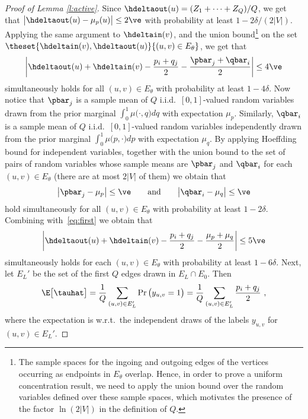\begin{proof}[Proof of Lemma \ref{l:active}]
Since $\hdeltaout(u) = (Z_1+\cdots+Z_Q)/Q$, we get that $\big|\hdeltaout(u) - \mu_p(u)\big| \le
2\ve$ with probability at least $1-2\delta/(2|V|)$. Applying the same argument to $\hdeltain(v)$,
and the union bound\footnote{The sample spaces for the ingoing and outgoing edges of the vertices
occurring as endpoints in $E_{\theta}$ overlap. Hence, in order to prove a uniform concentration
result, we need to apply the union bound over the random variables defined over these sample spaces,
which motivates the presence of the factor $\ln(2|V|)$ in the definition of $Q$.}
on the set $\theset{\hdeltain(v),\hdeltaout(u)}{(u,v) \in E_{\theta}}$, we get that
\begin{equation}
  \label{eq:first}
  \left| \hdeltaout(u) + \hdeltain(v) - \frac{p_i + q_j}{2} - \frac{\pbar_j + \qbar_i}{2} \right| \le 4\ve
\end{equation}
simultaneously holds for all $(u,v) \in E_{\theta}$ with probability at least $1 - 4\delta$. Now
notice that $\pbar_j$ is a sample mean of $Q$ i.i.d.\ $[0,1]$-valued random variables drawn from the
prior marginal $\int_0^1 \mu\big(\cdot,q\bigr) dq$ with expectation $\mu_p$. Similarly, $\qbar_i$ is
a sample mean of $Q$ i.i.d.\ $[0,1]$-valued random variables independently drawn from the prior
marginal $\int_0^1 \mu\big(p,\cdot\big) dp$ with expectation $\mu_q$. By applying Hoeffding bound
for independent variables, together with the union bound to the set of pairs of random variables
whose sample means are $\pbar_j$ and $\qbar_i$ for each $(u,v) \in E_{\theta}$ (there are at most
$2|V|$ of them) we obtain that
\begin{align*}
  \big|\pbar_j - \mu_p\big| \le \ve
  \qquad\text{and}\qquad
  \big|\qbar_i - \mu_q\big| \le \ve
\end{align*}
hold simultaneously for all $(u,v) \in E_{\theta}$ with probability at least $1-2\delta$. Combining
with~\eqref{eq:first} we obtain that
\begin{equation}
  \label{eq:this}
  \left| \hdeltaout(u) + \hdeltain(v) - \frac{p_i + q_j}{2} - \frac{\mu_p + \mu_q}{2} \right| \le 5\ve
\end{equation}
simultaneously holds for each $(u,v) \in E_{\theta}$ with probability at least $1 - 6\delta$. Next,
let $E_L'$ be the set of the first $Q$ edges drawn in $E_L \cap E_0$. Then
\[
  \E\big[\tauhat\big] = \frac{1}{Q}\sum_{(u,v) \in E_L'} \Pr\big(y_{u,v} = 1\big) = \frac{1}{Q}\sum_{(u,v) \in E_L'} \frac{p_i+q_j}{2}~,
\]
where the expectation is w.r.t.\ the independent draws of the labels $y_{u,v}$ for $(u,v) \in E_L'$.

\end{proof}
